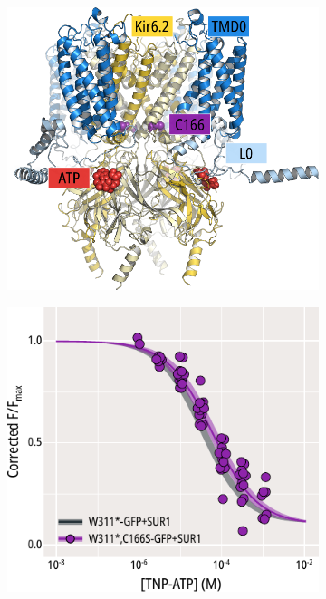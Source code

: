 \begin{figure}[hbtp]
	\centering
	\begin{subfigure}[t]{0.45\textwidth}
		\caption{}\label{ch5fig:c166s_loc}
		\centering
		\includegraphics[width=\textwidth]{c166s_1.pdf}
	\end{subfigure}
	\hfill
	\begin{subfigure}[t]{0.45\textwidth}
		\caption{}\label{ch5fig:c166s_popfits}
		\centering
		\includegraphics[width=\textwidth]{c166s_2.pdf}

\end{subfigure}
\end{figure}
